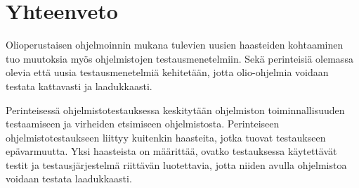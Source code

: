 \documentclass[finnish, grading]{tktltiki2}
\theoremstyle{definition}
\theoremstyle{remark}
\begin{document}










\section{Yhteenveto}

Olioperustaisen ohjelmoinnin mukana tulevien uusien haasteiden kohtaaminen tuo muutoksia myös ohjelmistojen testausmenetelmiin. Sekä perinteisiä olemassa olevia että uusia testausmenetelmiä kehitetään, jotta olio-ohjelmia voidaan testata kattavasti ja laadukkaasti. 

Perinteisessä ohjelmistotestauksessa keskitytään ohjelmiston toiminnallisuuden testaamiseen ja virheiden etsimiseen ohjelmistosta. Perinteiseen ohjelmistotestaukseen liittyy kuitenkin haasteita, jotka tuovat testaukseen epävarmuutta. Yksi haasteista on määrittää, ovatko testauksessa käytettävät testit ja testausjärjestelmä riittävän luotettavia, jotta niiden avulla ohjelmistoa voidaan testata laadukkaasti.
\end{document}
